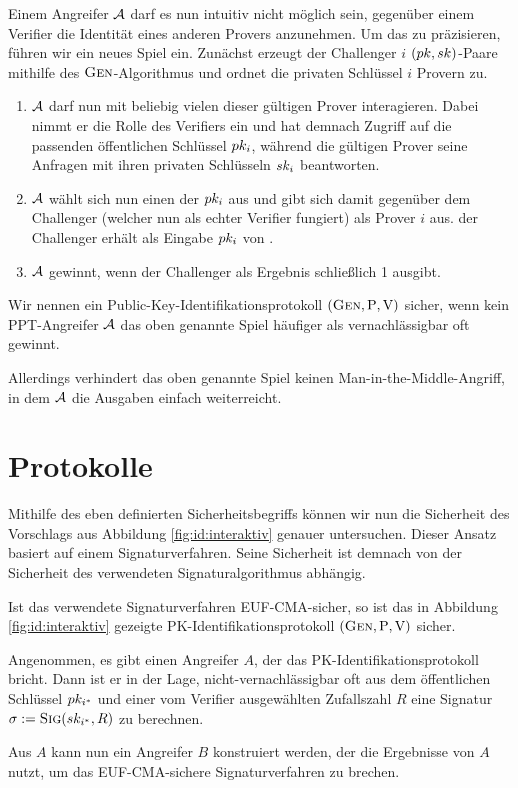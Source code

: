Einem Angreifer $\mathcal{A}$ darf es nun intuitiv nicht möglich sein, gegenüber
einem Verifier die Identität eines anderen Provers anzunehmen. Um das zu
präzisieren, führen wir ein neues Spiel ein. Zunächst erzeugt der Challenger $i$
$(pk, sk)$-Paare mithilfe des $\textsc{Gen}$-Algorithmus und ordnet die privaten Schlüssel $i$ Provern zu.
\begin{enumerate}
  \item $\mathcal{A}$ darf nun mit beliebig vielen dieser gültigen Prover
interagieren. Dabei nimmt er die Rolle des Verifiers ein und hat demnach
Zugriff auf die passenden öffentlichen Schlüssel $pk_i$, während die
gültigen Prover seine Anfragen mit ihren privaten Schlüsseln $sk_i$
beantworten.
  \item $\mathcal{A}$ wählt sich nun einen der $pk_{i}$ aus und gibt sich
    damit gegenüber dem Challenger (welcher nun als \glqq echter\grqq{}
    Verifier fungiert) als Prover $i$ aus. der Challenger erhält als
    Eingabe $pk_i$ von \A.
  \item $\mathcal{A}$ gewinnt, wenn der Challenger als Ergebnis schließlich 1
ausgibt.
\end{enumerate} Wir nennen ein Public-Key-Identifikationsprotokoll
$(\textsc{Gen}, \mathrm{P}, \mathrm{V})$ sicher, wenn kein PPT-Angreifer $\mathcal{A}$
das oben genannte Spiel häufiger als vernachlässigbar oft gewinnt.

Allerdings verhindert das oben genannte Spiel keinen
Man-in-the-Middle-Angriff, in dem $\mathcal{A}$ die Ausgaben einfach
weiterreicht.


\section{Protokolle}\label{sec:id:protokolle}
Mithilfe des eben definierten Sicherheitsbegriffs können wir nun die
Sicherheit des Vorschlags aus Abbildung \ref{fig:id:interaktiv} genauer untersuchen.
Dieser Ansatz basiert auf einem Signaturverfahren. Seine
Sicherheit ist demnach von der Sicherheit des verwendeten
Signaturalgorithmus abhängig.~\\

\begin{theorem} Ist das verwendete Signaturverfahren EUF-CMA-sicher, so
ist das in Abbildung \ref{fig:id:interaktiv} gezeigte
PK-Identifikationsprotokoll $(\textsc{Gen}, \mathrm{P}, \mathrm{V})$ sicher.~\\
\end{theorem}
\begin{beweisidee} Angenommen, es gibt einen Angreifer $A$, der das
PK-Identifikationsprotokoll bricht. Dann ist er in der Lage,
nicht-vernachlässigbar oft aus dem öffentlichen Schlüssel $pk_{i^*}$
und einer vom Verifier ausgewählten Zufallszahl $R$ eine Signatur
$\sigma := \textsc{Sig}(sk_{i^*}, R)$ zu berechnen.

Aus $A$ kann nun ein Angreifer $B$ konstruiert werden, der die
Ergebnisse von $A$ nutzt, um das EUF-CMA-sichere Signaturverfahren zu
brechen.~\\
\end{beweisidee}

